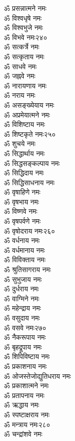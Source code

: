 \begin{center}
\begin{multicols}{2}
\begin{flushleft}
ॐ प्रसन्नात्मने नमः\\
ॐ विश्वधृषे नमः\\
ॐ विश्वभुजे नमः\\
ॐ विभवे नमः\hfill २४०\\
ॐ सत्कर्त्रे नमः\\
ॐ सत्कृताय नमः\\
ॐ साधवे नमः\\
ॐ जह्नवे नमः\\
ॐ नारायणाय नमः\\
ॐ नराय नमः\\
ॐ असङ्ख्येयाय नमः\\
ॐ अप्रमेयात्मने नमः\\
ॐ विशिष्टाय नमः\\
ॐ शिष्टकृते नमः\hfill २५०\\
ॐ शुचये नमः\\
ॐ सिद्धार्थाय नमः\\
ॐ सिद्धसङ्कल्पाय नमः\\
ॐ सिद्धिदाय नमः\\
ॐ सिद्धिसाधनाय नमः\\
ॐ वृषाहिणे नमः\\
ॐ वृषभाय नमः\\
ॐ विष्णवे नमः\\
ॐ वृषपर्वणे नमः\\
ॐ वृषोदराय नमः\hfill २६०\\
ॐ वर्धनाय नमः\\
ॐ वर्धमानाय नमः\\
ॐ विविक्ताय नमः\\
ॐ श्रुतिसागराय नमः\\
ॐ सुभुजाय नमः\\
ॐ दुर्धराय नमः\\
ॐ वाग्मिने नमः\\
ॐ महेन्द्राय नमः\\
ॐ वसुदाय नमः\\
ॐ वसवे नमः\hfill २७०\\
ॐ नैकरूपाय नमः\\
ॐ बृहद्रूपाय नमः\\
ॐ शिपिविष्टाय नमः\\
ॐ प्रकाशनाय नमः\\
ॐ ओजस्तेजोद्युतिधराय नमः\\
ॐ प्रकाशात्मने नमः\\
ॐ प्रतापनाय नमः\\
ॐ ऋद्धाय नमः\\
ॐ स्पष्टाक्षराय नमः\\
ॐ मन्त्राय नमः\hfill २८०\\
ॐ चन्द्रांशवे नमः\\

\end{flushleft}
\end{multicols}
\end{center}
